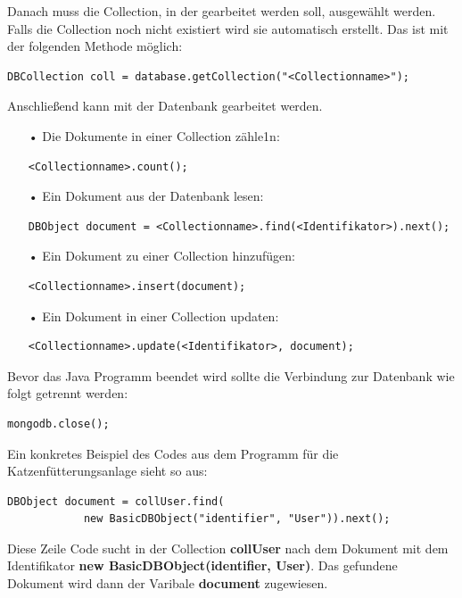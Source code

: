 Danach muss die Collection, in der gearbeitet werden soll, ausgewählt werden. Falls die Collection noch nicht existiert wird sie automatisch erstellt. Das ist mit der folgenden Methode möglich:
\begin{lstlisting}[style=JavaStyle]
	DBCollection coll = database.getCollection("<Collectionname>");
\end{lstlisting}
Anschließend kann mit der Datenbank gearbeitet werden. 
\begin{itemize}
\item[•] Die Dokumente in einer Collection zähle1n:
\begin{lstlisting}[style=JavaStyle]
	<Collectionname>.count();
\end{lstlisting}
\item[•] Ein Dokument aus der Datenbank lesen:
\begin{lstlisting}[style=JavaStyle]
	DBObject document = <Collectionname>.find(<Identifikator>).next();
\end{lstlisting}
\item[•] Ein Dokument zu einer Collection hinzufügen:
\begin{lstlisting}[style=JavaStyle]
	<Collectionname>.insert(document);
\end{lstlisting}	
\item[•] Ein Dokument in einer Collection updaten:
\begin{lstlisting}[style=JavaStyle]
	<Collectionname>.update(<Identifikator>, document);
\end{lstlisting}
\end{itemize}

Bevor das Java Programm beendet wird sollte die Verbindung zur Datenbank wie folgt getrennt werden: 
\begin{lstlisting}[style=JavaStyle]
	mongodb.close();
\end{lstlisting}

\newpage

Ein konkretes Beispiel des Codes aus dem Programm für die Katzenfütterungsanlage sieht so aus:
\begin{lstlisting}[style=JavaStyle]
	DBObject document = collUser.find(
			new BasicDBObject("identifier", "User")).next();
\end{lstlisting}
Diese Zeile Code sucht in der Collection \textbf{collUser} nach dem Dokument mit dem Identifikator \textbf{new BasicDBObject(\grqq{}identifier\grqq{}, \grqq{}User\grqq{})}. Das gefundene Dokument wird dann der Varibale \textbf{document} zugewiesen. 


